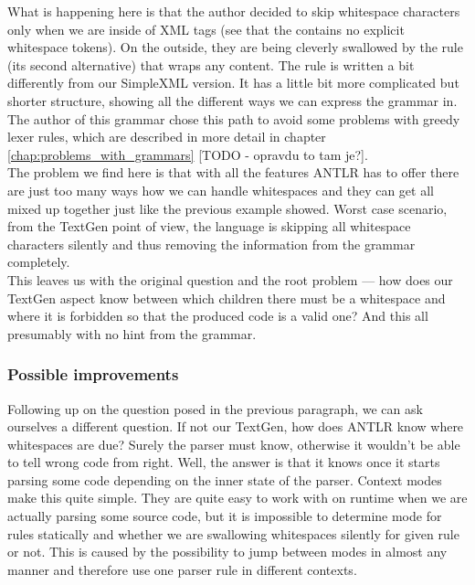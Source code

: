 What is happening here is that the author decided to skip whitespace characters only when we are inside of XML tags (see that the  contains no explicit whitespace tokens). On the outside, they are being cleverly swallowed by the  rule (its second alternative) that wraps any content. The  rule is written a bit differently from our SimpleXML version. It has a little bit more complicated but shorter structure, showing all the different ways we can express the grammar in. The author of this grammar chose this path to avoid some problems with greedy lexer rules, which are described in more detail in chapter \ref{chap:problems_with_grammars} [TODO - opravdu to tam je?].
\\

The problem we find here is that with all the features ANTLR has to offer there are just too many ways how we can handle whitespaces and they can get all mixed up together just like the previous example showed. Worst case scenario, from the TextGen point of view, the language is skipping all whitespace characters silently and thus removing the information from the grammar completely. 
\\

This leaves us with the original question and the root problem --- how does our TextGen aspect know between which children there must be a whitespace and where it is forbidden so that the produced code is a valid one? And this all presumably with no hint from the grammar.

\subsubsection{Possible improvements}

Following up on the question posed in the previous paragraph, we can ask ourselves a different question. If not our TextGen, how does ANTLR know where whitespaces are due? Surely the parser must know, otherwise it wouldn't be able to tell wrong code from right. Well, the answer is that it knows once it starts parsing some code depending on the inner state of the parser. Context modes make this quite simple. They are quite easy to work with on runtime when we are actually parsing some source code, but it is impossible to determine mode for rules statically and whether we are swallowing whitespaces silently for given rule or not. This is caused by the possibility to jump between modes in almost any manner and therefore use one parser rule in different contexts.
\\

